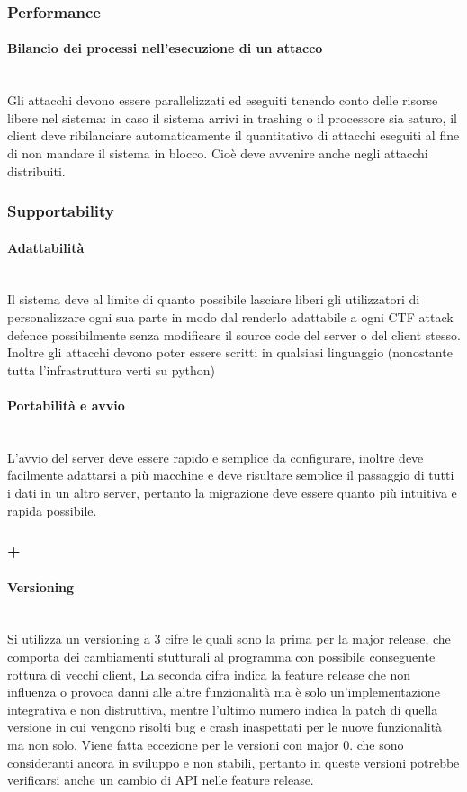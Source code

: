 \documentclass[11pt]{article}
\begin{document}
\subsubsection{Performance}
\paragraph{Bilancio dei processi nell'esecuzione di un attacco}\mbox{}\\
Gli attacchi devono essere parallelizzati ed eseguiti tenendo conto delle risorse libere nel sistema: in caso il sistema arrivi in trashing o il processore sia saturo, il client deve ribilanciare automaticamente il quantitativo di attacchi eseguiti al fine di non mandare il sistema in blocco. Cioè deve avvenire anche negli attacchi distribuiti.
\subsubsection{Supportability}
\paragraph{Adattabilità}\mbox{}\\
Il sistema deve al limite di quanto possibile lasciare liberi gli utilizzatori di personalizzare ogni sua parte in modo dal renderlo adattabile a ogni CTF attack defence possibilmente senza modificare il source code del server o del client stesso. Inoltre gli attacchi devono poter essere scritti in qualsiasi linguaggio (nonostante tutta l'infrastruttura verti su python)
\paragraph{Portabilità e avvio}\mbox{}\\
L'avvio del server deve essere rapido e semplice da configurare, inoltre deve facilmente adattarsi a più macchine e deve risultare semplice il passaggio di tutti i dati in un altro server, pertanto la migrazione deve essere quanto più intuitiva e rapida possibile.
\subsubsection{+}
\paragraph{Versioning}\mbox{}\\
Si utilizza un versioning a 3 cifre le quali sono la prima per la major release, che comporta dei cambiamenti stutturali al programma con possibile conseguente rottura di vecchi client, La seconda cifra indica la feature release che non influenza o provoca danni alle altre funzionalità ma è solo un'implementazione integrativa e non distruttiva, mentre l'ultimo numero indica la patch di quella versione in cui vengono risolti bug e crash inaspettati per le nuove funzionalità ma non solo.
Viene fatta eccezione per le versioni con major 0. che sono consideranti ancora in sviluppo e non stabili, pertanto in queste versioni potrebbe verificarsi anche un cambio di API nelle feature release.
\end{document}
